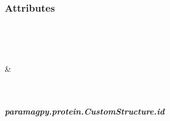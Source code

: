 \documentclass[a4paper,10pt,english,openany,oneside]{sphinxmanual}
\begin{document}
\begin{fulllineitems}
\begin{fulllineitems}
\begin{fulllineitems}
%
\begin{sphinxVerbatim}[commandchars=\\\{\}]
     
     
 
\end{sphinxVerbatim}

\end{fulllineitems}

\subsubsection*{Attributes}


\begin{savenotes}\sphinxatlongtablestart\begin{longtable}{}
\hline

\endfirsthead

%
{}\\
\hline

\endhead

\hline
{}\\
\endfoot

\endlastfoot

{\hyperref[\detokenize{reference/generated/paramagpy.protein.CustomStructure.id:paramagpy.protein.CustomStructure.id}]{}}
&

\\
\hline
\end{longtable}\sphinxatlongtableend\end{savenotes}


\subparagraph{paramagpy.protein.CustomStructure.id}
\label{\detokenize{reference/generated/paramagpy.protein.CustomStructure.id:paramagpy-protein-customstructure-id}}\label{\detokenize{reference/generated/paramagpy.protein.CustomStructure.id::doc}}


\end{fulllineitems}
\end{fulllineitems}
\end{document}
